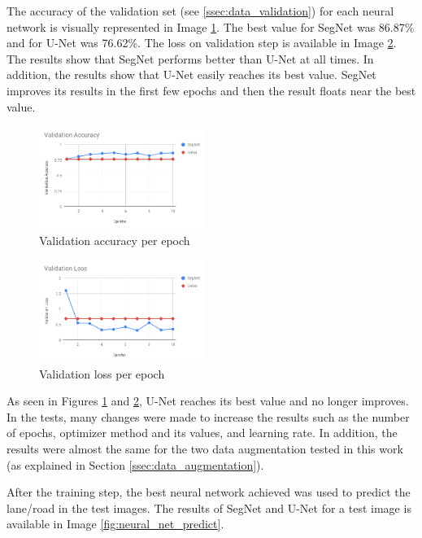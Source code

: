 \documentclass[10pt,twocolumn,letterpaper]{article}
\begin{document}
The accuracy of the validation set (see \ref{ssec:data_validation}) for each neural network is visually represented in Image \ref{fig:val_acc}. The best value for SegNet was 86.87\% and for U-Net was 76.62\%. The loss on validation step is available in Image \ref{fig:val_loss}. The results show that SegNet performs better than U-Net at all times. In addition, the results show that U-Net easily reaches its best value. SegNet improves its results in the first few epochs and then the result floats near the best value.

\begin{figure}[ht]
  \centering
  \includegraphics[width=0.48\textwidth]{graph_val_acc.png}
  \caption{Validation accuracy per epoch}
  \label{fig:val_acc}
\end{figure}

\begin{figure}[ht]
  \centering
  \includegraphics[width=0.48\textwidth]{graph_val_loss.png}
  \caption{Validation loss per epoch}
  \label{fig:val_loss}
\end{figure}

As seen in Figures \ref{fig:val_acc} and \ref{fig:val_loss}, U-Net reaches its best value and no longer improves. In the tests, many changes were made to increase the results such as the number of epochs, optimizer method and its values, and learning rate. In addition, the results were almost the same for the two data augmentation tested in this work (as explained in Section \ref{ssec:data_augmentation}).

After the training step, the best neural network achieved was used to predict the lane/road in the test images. The results of SegNet and U-Net for a test image is available in Image 
\ref{fig:neural_net_predict}.
\end{document}
